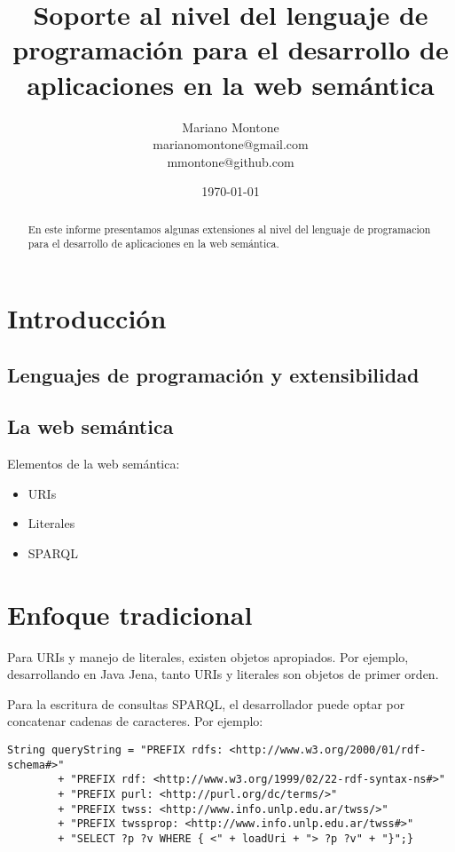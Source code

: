 \documentclass[12pt]{article}
\title{Soporte al nivel del lenguaje de programación para el desarrollo de aplicaciones en la web semántica}
\author{
        Mariano Montone \\
        marianomontone@gmail.com \\
        mmontone@github.com
}
\date{\today}
\begin{document}
\maketitle

\begin{abstract}
En este informe presentamos algunas extensiones al nivel del lenguaje de programacion para el desarrollo de aplicaciones en la web semántica.
\end{abstract}

\section{Introducci\'on}
\subsection{Lenguajes de programaci\'on y extensibilidad}

\subsection{La web sem\'antica}

Elementos de la web sem\'antica:
\begin{itemize}
\item URIs
\item Literales
\item SPARQL  
\end{itemize}

\section{Enfoque tradicional}

Para URIs y manejo de literales, existen objetos apropiados. Por ejemplo, desarrollando en Java Jena, tanto URIs y literales son objetos de primer orden.

Para la escritura de consultas SPARQL, el desarrollador puede optar por concatenar cadenas de caracteres. Por ejemplo:

\begin{lstlisting}
String queryString = "PREFIX rdfs: <http://www.w3.org/2000/01/rdf-schema#>"
		+ "PREFIX rdf: <http://www.w3.org/1999/02/22-rdf-syntax-ns#>"
		+ "PREFIX purl: <http://purl.org/dc/terms/>"
		+ "PREFIX twss: <http://www.info.unlp.edu.ar/twss/>"
		+ "PREFIX twssprop: <http://www.info.unlp.edu.ar/twss#>"
		+ "SELECT ?p ?v WHERE { <" + loadUri + "> ?p ?v" + "}";}
\end{lstlisting}	
\end{document}
